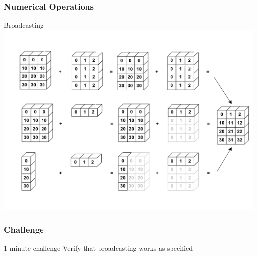 \documentclass[colorlinks]{beamer}
\begin{document}
\begin{frame}[fragile]\frametitle{Numerical Operations}
\begin{block}{Broadcasting}
\includegraphics[scale=0.25]{figs/numpy_broadcasting}

\end{block}

\end{frame}

\begin{frame}[fragile]\frametitle{Challenge}
\begin{block}{1 minute challenge}
Verify that broadcasting works as specified
\end{block}

\end{frame}
\end{document}
